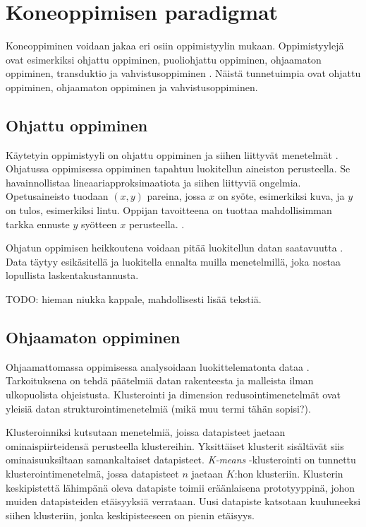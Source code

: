 \documentclass[utf8]{gradu3}
\begin{document}
\section{Koneoppimisen paradigmat}

Koneoppiminen voidaan jakaa eri osiin oppimistyylin mukaan. Oppimistyylejä ovat esimerkiksi ohjattu oppiminen, puoliohjattu oppiminen, ohjaamaton oppiminen, transduktio ja vahvistusoppiminen \parencite{das2017survey}. Näistä tunnetuimpia ovat ohjattu oppiminen, ohjaamaton oppiminen ja vahvistusoppiminen.

\subsection{Ohjattu oppiminen}

Käytetyin oppimistyyli on ohjattu oppiminen ja siihen liittyvät menetelmät \parencite{jordan2015machine}. Ohjatussa oppimisessa oppiminen tapahtuu luokitellun aineiston perusteella. Se havainnollistaa lineaariapproksimaatiota ja siihen liittyviä ongelmia. Opetusaineisto tuodaan \((x,y)\) pareina, jossa \(x\) on syöte, esimerkiksi kuva, ja \(y\) on tulos, esimerkiksi lintu. Oppijan tavoitteena on tuottaa mahdollisimman tarkka ennuste \(y\) syötteen \(x\) perusteella. \parencite{jordan2015machine}.

Ohjatun oppimisen heikkoutena voidaan pitää luokitellun datan saatavuutta \parencite{das2017survey}. Data täytyy esikäsitellä ja luokitella ennalta muilla menetelmillä, joka nostaa lopullista laskentakustannusta.

TODO: hieman niukka kappale, mahdollisesti lisää tekstiä.

\subsection{Ohjaamaton oppiminen}

Ohjaamattomassa oppimisessa analysoidaan luokittelematonta dataa \parencite{das2017survey,jordan2015machine}. Tarkoituksena on tehdä päätelmiä datan rakenteesta ja malleista ilman ulkopuolista ohjeistusta. Klusterointi ja dimension redusointimenetelmät ovat yleisiä datan strukturointimenetelmiä (mikä muu termi tähän sopisi?).

Klusteroinniksi kutsutaan menetelmiä, joissa datapisteet jaetaan ominaispiirteidensä perusteella klustereihin. Yksittäiset klusterit sisältävät siis ominaisuuksiltaan samankaltaiset datapisteet. \textit{K-means} -klusterointi on tunnettu klusterointimenetelmä, jossa datapisteet \(n\) jaetaan \(K\):hon klusteriin. Klusterin keskipistettä lähimpänä oleva datapiste toimii eräänlaisena prototyyppinä, johon muiden datapisteiden etäisyyksiä verrataan. Uusi datapiste katsotaan kuuluneeksi siihen klusteriin, jonka keskipisteeseen on pienin etäisyys.
\end{document}
